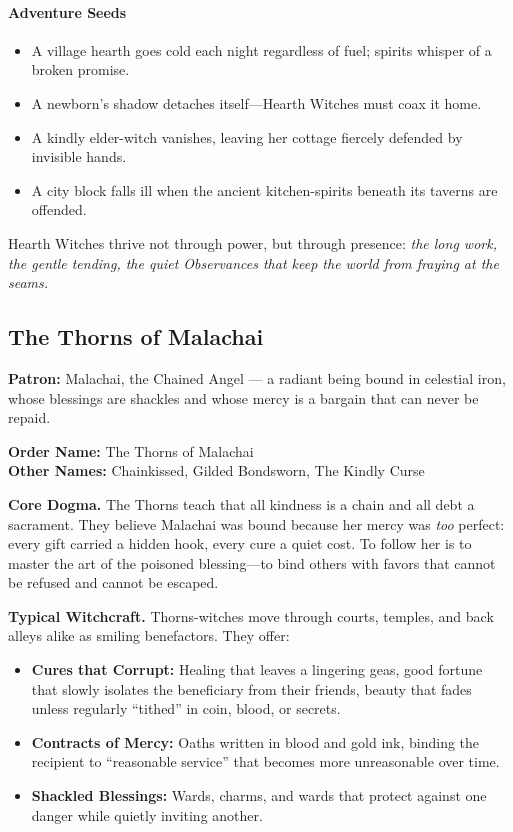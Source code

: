 \documentclass[11pt]{book}
\begin{document}
\paragraph{Adventure Seeds}
\begin{itemize}
    \item A village hearth goes cold each night regardless of fuel; spirits whisper of a broken promise.
    \item A newborn's shadow detaches itself---Hearth Witches must coax it home.
    \item A kindly elder-witch vanishes, leaving her cottage fiercely defended by invisible hands.
    \item A city block falls ill when the ancient kitchen-spirits beneath its taverns are offended.
\end{itemize}

\medskip

\noindent Hearth Witches thrive not through power, but through presence:  
\textit{the long work, the gentle tending, the quiet Observances that keep the world from fraying at the seams.}

\subsection*{The Thorns of Malachai}
\label{order:thorns_malachai}

\textbf{Patron:} Malachai, the Chained Angel --- a radiant being bound in celestial iron, whose blessings are shackles and whose mercy is a bargain that can never be repaid.

\medskip

\textbf{Order Name:} The Thorns of Malachai\\
\textbf{Other Names:} Chainkissed, Gilded Bondsworn, The Kindly Curse

\medskip

\textbf{Core Dogma.}
The Thorns teach that all kindness is a chain and all debt a sacrament. They believe Malachai was bound because her mercy was \emph{too} perfect: every gift carried a hidden hook, every cure a quiet cost. To follow her is to master the art of the poisoned blessing---to bind others with favors that cannot be refused and cannot be escaped.

\medskip

\textbf{Typical Witchcraft.}
Thorns-witches move through courts, temples, and back alleys alike as smiling benefactors. They offer:
\begin{itemize}[leftmargin=*]
  \item \textbf{Cures that Corrupt:} Healing that leaves a lingering geas, good fortune that slowly isolates the beneficiary from their friends, beauty that fades unless regularly ``tithed'' in coin, blood, or secrets.
  \item \textbf{Contracts of Mercy:} Oaths written in blood and gold ink, binding the recipient to ``reasonable service'' that becomes more unreasonable over time.
  \item \textbf{Shackled Blessings:} Wards, charms, and wards that protect against one danger while quietly inviting another.
\end{itemize}
\end{document}
